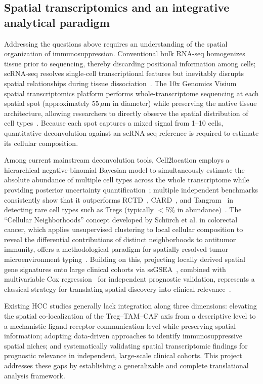 \documentclass[12pt, a4paper]{article}
\begin{document}
\subsection{Spatial transcriptomics and an integrative analytical paradigm}

Addressing the questions above requires an understanding of the spatial organization of immunosuppression. Conventional bulk RNA-seq homogenizes tissue prior to sequencing, thereby discarding positional information among cells; scRNA-seq resolves single-cell transcriptional features but inevitably disrupts spatial relationships during tissue dissociation~\citep{luecken2019current}. The 10x Genomics Visium spatial transcriptomics platform performs whole-transcriptome sequencing at each spatial spot (approximately 55\,$\mu$m in diameter) while preserving the native tissue architecture, allowing researchers to directly observe the spatial distribution of cell types~\citep{williams2022introduction}. Because each spot captures a mixed signal from 1--10 cells, quantitative deconvolution against an scRNA-seq reference is required to estimate its cellular composition.

Among current mainstream deconvolution tools, Cell2location employs a hierarchical negative-binomial Bayesian model to simultaneously estimate the absolute abundance of multiple cell types across the whole transcriptome while providing posterior uncertainty quantification~\citep{kleshchevnikov2022cell2location}; multiple independent benchmarks consistently show that it outperforms RCTD~\citep{cable2021robust}, CARD~\citep{ma2022integrative}, and Tangram~\citep{biancalani2021deep} in detecting rare cell types such as Tregs (typically $<$5\% in abundance)~\citep{li2022benchmarking,sang2023spotless,yan2023benchmarking}. The ``Cellular Neighborhoods'' concept developed by Schürch et al. in colorectal cancer, which applies unsupervised clustering to local cellular composition to reveal the differential contributions of distinct neighborhoods to antitumor immunity, offers a methodological paradigm for spatially resolved tumor microenvironment typing~\citep{schurch2020coordinated}. Building on this, projecting locally derived spatial gene signatures onto large clinical cohorts via ssGSEA~\citep{barbie2009systematic}, combined with multivariable Cox regression~\citep{cox1972regression} for independent prognostic validation, represents a classical strategy for translating spatial discovery into clinical relevance~\citep{hanzelmann2013gsva}.

Existing HCC studies generally lack integration along three dimensions: elevating the spatial co-localization of the Treg--TAM--CAF axis from a descriptive level to a mechanistic ligand-receptor communication level while preserving spatial information; adopting data-driven approaches to identify immunosuppressive spatial niches; and systematically validating spatial transcriptomic findings for prognostic relevance in independent, large-scale clinical cohorts. This project addresses these gaps by establishing a generalizable and complete translational analysis framework.
\end{document}

